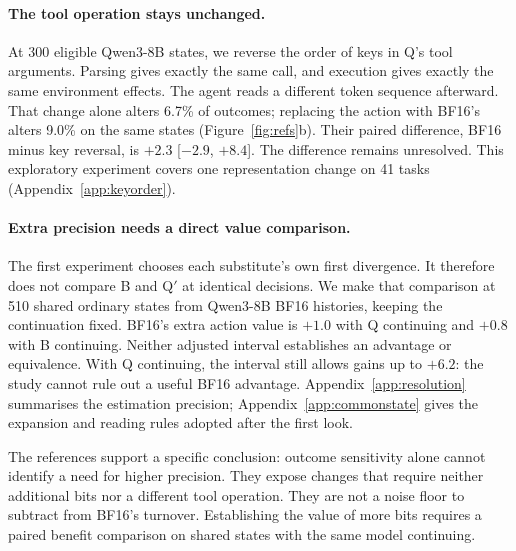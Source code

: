 \paragraph{The tool operation stays unchanged.} At 300 eligible Qwen3-8B states, we reverse the order of keys in Q's tool arguments. Parsing gives exactly the same call, and execution gives exactly the same environment effects. The agent reads a different token sequence afterward. That change alone alters 6.7\% of outcomes; replacing the action with BF16's alters 9.0\% on the same states (Figure~\ref{fig:refs}b). Their paired difference, BF16 minus key reversal, is $+2.3$\pp{} [$-2.9$, $+8.4$]. The difference remains unresolved. This exploratory experiment covers one representation change on 41 tasks (Appendix~\ref{app:keyorder}). %

\paragraph{Extra precision needs a direct value comparison.} The first experiment chooses each substitute's own first divergence. It therefore does not compare B and Q$'$ at identical decisions. We make that comparison at 510 shared ordinary states from Qwen3-8B BF16 histories, keeping the continuation fixed. BF16's extra action value is $+1.0$\pp{} with Q continuing and $+0.8$\pp{} with B continuing. Neither adjusted interval establishes an advantage or equivalence. With Q continuing, the interval still allows gains up to $+6.2$\pp{}: the study cannot rule out a useful BF16 advantage. Appendix~\ref{app:resolution} summarises the estimation precision; Appendix~\ref{app:commonstate} gives the expansion and reading rules adopted after the first look. %

The references support a specific conclusion: outcome sensitivity alone cannot identify a need for higher precision. They expose changes that require neither additional bits nor a different tool operation. They are not a noise floor to subtract from BF16's turnover. Establishing the value of more bits requires a paired benefit comparison on shared states with the same model continuing.

